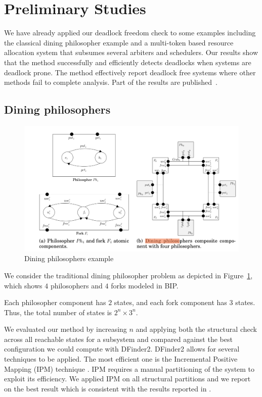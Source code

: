 \section{Preliminary Studies}

We have already applied our deadlock freedom check to some 
examples including the classical dining philosopher 
example and a multi-token based resource allocation system that
subsumes several arbiters and schedulers.
%
Our results show that the method successfully 
and efficiently detects deadlocks when systems are 
deadlock prone.
The method effectively report deadlock free systems 
where other methods fail to complete analysis. 
Part of the results are published~\cite{FORTE13}. 

\subsection{Dining philosophers}

\begin{figure}
  \includegraphics{fig/dining}
  \caption{Dining philosophers example}\label{fig:dining}
\end{figure}

We consider the traditional dining philosopher problem as depicted in 
Figure~\ref{fig:dining}, which shows $4$ philosophers and $4$ forks modeled in BIP. 

Each philosopher component has $2$ states, and each fork component has $3$ states. 
Thus, the total number of states is $2^n \times 3^n$. 

We evaluated our method by increasing $n$ and applying both 
the structural check across all reachable states for a
subsystem and compared against the best configuration 
we could compute with DFinder2. 
DFinder2 allows for several techniques to be applied. 
The most efficient one is 
the Incremental Positive Mapping (IPM) technique \cite{DFinder2}. 
IPM requires a manual partitioning of the system to exploit its efficiency. 
We applied IPM on all structural partitions and we report on the best result which is consistent 
with the results reported in \cite{DFinder2}. 

